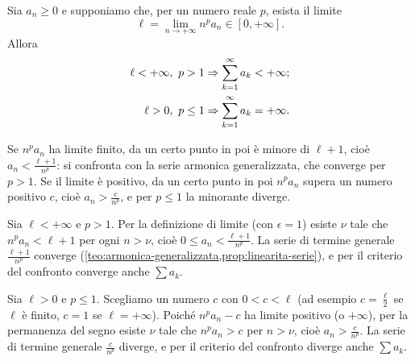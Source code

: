 \begin{teorema}\label{teo:criterio-infinitesimi}
Sia $a_{n}\ge0$ e supponiamo che, per un numero reale $p$, esista il limite
\begin{equation}\label{eq:limite-infinitesimi}
  \ell=\lim_{n\to+\infty}n^{p}a_{n}\in[0,+\infty] .
\end{equation}
Allora
\begin{align}
  \ell<+\infty,\ p>1 &\Rightarrow \sum_{k=1}^{\infty}a_{k}<+\infty ; \label{eq:infinitesimi-conv}\\
  \ell>0,\ p\le1 &\Rightarrow \sum_{k=1}^{\infty}a_{k}=+\infty . \label{eq:infinitesimi-div}
\end{align}
\end{teorema}

\begin{schema}
\end{schema}

\begin{strategia}
Se $n^{p}a_{n}$ ha limite finito, da un certo punto in poi è minore di $\ell+1$, cioè
$a_{n}<\frac{\ell+1}{n^{p}}$: si confronta con la serie armonica generalizzata, che converge per
$p>1$. Se il limite è positivo, da un certo punto in poi $n^{p}a_{n}$ supera un numero
positivo $c$, cioè $a_{n}>\frac c{n^{p}}$, e per $p\le1$ la minorante diverge.
\end{strategia}

\begin{dimostrazione}
Sia $\ell<+\infty$ e $p>1$. Per la definizione di limite (con $\epsilon=1$) esiste $\nu$ tale che
$n^{p}a_{n}<\ell+1$ per ogni $n>\nu$, cioè $0\le a_{n}<\frac{\ell+1}{n^{p}}$. La serie di termine generale
$\frac{\ell+1}{n^{p}}$ converge (\cref{teo:armonica-generalizzata,prop:linearita-serie}), e per il
criterio del confronto converge anche $\sum a_{k}$.

Sia $\ell>0$ e $p\le1$. Scegliamo un numero $c$ con $0<c<\ell$ (ad esempio $c=\frac\ell2$ se
$\ell$ è finito, $c=1$ se $\ell=+\infty$). Poiché $n^{p}a_{n}-c$ ha limite positivo (o $+\infty$),
per la permanenza del segno esiste $\nu$ tale che $n^{p}a_{n}>c$ per $n>\nu$, cioè $a_{n}>\frac c{n^{p}}$. La serie di
termine generale $\frac c{n^{p}}$ diverge, e per il criterio del confronto diverge anche
$\sum a_{k}$.
\end{dimostrazione}

